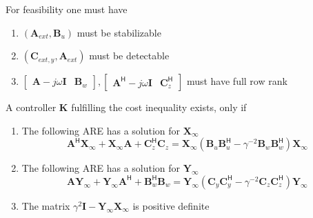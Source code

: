 For feasibility one must have
\begin{enumerate}
    \item $(\mathbf{A}_{ext}, \mathbf{B}_u)$ must be stabilizable
    \item $(\mathbf{C}_{ext, y},\mathbf{A}_{ext})$ must be detectable
    \item $\begin{bmatrix}\mathbf{A}-j\omega \mathbf{I}&\mathbf{B}_w\end{bmatrix},\begin{bmatrix}\mathbf{A}^{\mathsf{H}}-j\omega \mathbf{I}&\mathbf{C}_z^{\mathsf{H}}\end{bmatrix}$ must have full row rank
\end{enumerate}
\newpar{}
A controller $\mathbf{K}$ fulfilling the cost inequality exists, only if
\begin{enumerate}
    \item The following ARE has a solution for $\mathbf{X}_{\infty}$
          \begin{equation*}
              \mathbf{A}^{\mathsf{H}}\mathbf{X}_{\infty}+\mathbf{X}_{\infty}\mathbf{A}+\mathbf{C}_{z}^{\mathsf{H}}\mathbf{C}_{z}=\mathbf{X}_{\infty}(\mathbf{B}_{u}\mathbf{B}_{u}^{\mathsf{H}}-\gamma^{-2}\mathbf{B}_{w}\mathbf{B}_{w}^{\mathsf{H}})\mathbf{X}_{\infty}
          \end{equation*}
    \item The following ARE has a solution for $\mathbf{Y}_{\infty}$
          \begin{equation*}
              \mathbf{A}\mathbf{Y}_\infty + \mathbf{Y}_\infty \mathbf{A}^{\mathsf{H}} + \mathbf{B}_w^{\mathsf{H}} \mathbf{B}_w = \mathbf{Y}_\infty (\mathbf{C}_y \mathbf{C}_y^{\mathsf{H}} - \gamma^{-2} \mathbf{C}_z \mathbf{C}_z^{\mathsf{H}}) \mathbf{Y}_\infty
          \end{equation*}
    \item The matrix $\gamma^2 \mathbf{I} - \mathbf{Y}_{\infty} \mathbf{X}_{\infty}$ is positive definite
\end{enumerate}

\newpar{}


